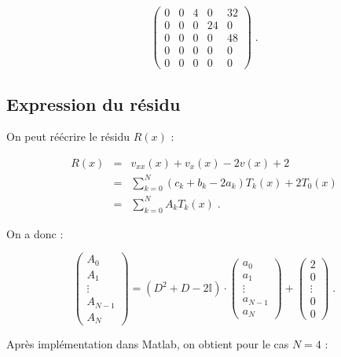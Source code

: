 \documentclass{report}
\begin{document}
\begin{equation}
\begin{pmatrix}
0 & 0 & 4 & 0 & 32\\ 
0 & 0 & 0 & 24 & 0\\ 
0 & 0 & 0 & 0 & 48\\ 
0 & 0 & 0 & 0 & 0\\ 
0 & 0 & 0 & 0 & 0
\end{pmatrix} \;.
\end{equation}

\subsection*{Expression du résidu}

On peut réécrire le résidu $R(x)$ :

\begin{eqnarray}
R(x) & = & v_{xx}(x) + v_x(x) - 2v(x) + 2 \\
& = & \sum_{k=0}^N \left(c_{k}+b_{k}-2a_{k}\right)T_{k}(x)+2 T_{0}(x)\\
& = & \sum_{k=0}^N A_{k} T_{k}(x)\;. 
\end{eqnarray}

On a donc :

\begin{equation}
\begin{pmatrix}
 A_{0}\\ 
 A_{1}\\ 
 \vdots\\ 
 A_{N-1}\\ 
 A_{N}
\end{pmatrix} 
= \left(D^{2} + D - 2 \mathbb{I}\right) \cdot \begin{pmatrix}
 a_0\\ 
 a_1\\ 
 \vdots\\ 
 a_{N-1}\\ 
 a_{N}
\end{pmatrix}
+ \begin{pmatrix}
 2\\ 
 0\\ 
 \vdots\\ 
 0\\ 
 0
\end{pmatrix}\;.\label{Ak}
\end{equation}

Après implémentation dans Matlab, on obtient pour le cas $N=4$ :
\end{document}
